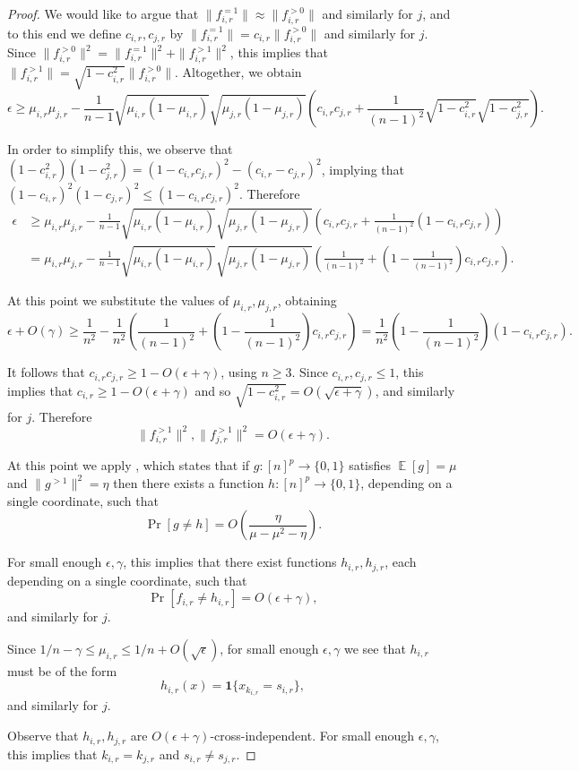 \documentclass{article}
\providecommand{\ind}[1]{\mathbf1\{#1\}}
\DeclareMathOperator*{\Ex}{\mathbb{E}}
\theoremstyle{definition}
\theoremstyle{remark}
\begin{document}
\begin{proof}
We would like to argue that $\|f_{i,r}^{=1}\| \approx \|f_{i,r}^{>0}\|$ and similarly for $j$, and to this end we define $c_{i,r},c_{j,r}$ by $\|f_{i,r}^{=1}\| = c_{i,r} \|f_{i,r}^{>0}\|$ and similarly for $j$. Since $\|f_{i,r}^{>0}\|^2 = \|f_{i,r}^{=1}\|^2 + \|f_{i,r}^{>1}\|^2$, this implies that $\|f_{i,r}^{>1}\| = \sqrt{1-c_{i,r}^2} \|f_{i,r}^{>0}\|$. Altogether, we obtain
\[
 \epsilon \ge \mu_{i,r} \mu_{j,r} - \frac{1}{n-1} \sqrt{\mu_{i,r} (1-\mu_{i,r})} \sqrt{\mu_{j,r} (1-\mu_{j,r})} \left( c_{i,r} c_{j,r} + \frac{1}{(n-1)^2} \sqrt{1 - c_{i,r}^2} \sqrt{1 - c_{j,r}^2} \right).
\]

In order to simplify this, we observe that $(1 - c_{i,r}^2) (1 - c_{j,r}^2) = (1 - c_{i,r} c_{j,r})^2 - (c_{i,r} - c_{j,r})^2$, implying that $(1 - c_{i,r})^2 (1 - c_{j,r})^2 \leq (1 - c_{i,r} c_{j,r})^2$. Therefore
\begin{align*}
 \epsilon &\ge \mu_{i,r} \mu_{j,r} - \frac{1}{n-1} \sqrt{\mu_{i,r} (1-\mu_{i,r})} \sqrt{\mu_{j,r} (1-\mu_{j,r})} \left( c_{i,r} c_{j,r} + \frac{1}{(n - 1)^2} (1 - c_{i,r} c_{j,r}) \right) \\ &=
 \mu_{i,r} \mu_{j,r} - \frac{1}{n-1} \sqrt{\mu_{i,r} (1-\mu_{i,r})} \sqrt{\mu_{j,r} (1-\mu_{j,r})} \left( \frac{1}{(n-1)^2} + \left(1 - \frac{1}{(n-1)^2}\right) c_{i,r} c_{j,r}\right).
\end{align*}

At this point we substitute the values of $\mu_{i,r}, \mu_{j,r}$, obtaining
\[
 \epsilon + O(\gamma) \ge \frac{1}{n^2} - \frac{1}{n^2} \left( \frac{1}{(n-1)^2} + \left(1 - \frac{1}{(n-1)^2}\right) c_{i,r} c_{j,r}\right) =
 \frac{1}{n^2} \left(1 - \frac{1}{(n-1)^2}\right) (1 - c_{i,r} c_{j,r}).
\]

It follows that $c_{i,r} c_{j,r} \ge 1 - O(\epsilon + \gamma)$, using $n \ge 3$. Since $c_{i,r}, c_{j,r} \leq 1$, this implies that $c_{i,r} \ge 1 - O(\epsilon + \gamma)$ and so $\sqrt{1 - c_{i,r}^2} = O(\sqrt{\epsilon + \gamma})$, and similarly for $j$. Therefore
\[
 \|f_{i,r}^{>1}\|^2, \|f_{j,r}^{>1}\|^2 = O(\epsilon + \gamma).
\]

At this point we apply \cite[Lemma 2.4]{ADFS}, which states that if $g\colon [n]^p \to \{0,1\}$ satisfies $\Ex[g] = \mu$ and $\|g^{>1}\|^2 = \eta$ then there exists a function $h\colon [n]^p \to \{0,1\}$, depending on a single coordinate, such that
\[
 \Pr[g \neq h] = O\left(\frac{\eta}{\mu - \mu^2 - \eta}\right).
\]

For small enough $\epsilon,\gamma$, this implies that there exist functions $h_{i,r},h_{j,r}$, each depending on a single coordinate, such that
\[
 \Pr[f_{i,r} \neq h_{i,r}] = O(\epsilon + \gamma),
\]
and similarly for $j$.

Since $1/n - \gamma \leq \mu_{i,r} \leq 1/n + O(\sqrt{\epsilon})$, for small enough $\epsilon,\gamma$ we see that $h_{i,r}$ must be of the form
\[
 h_{i,r}(x) = \ind{x_{k_{i,r}} = s_{i,r}},
\]
and similarly for $j$.

Observe that $h_{i,r},h_{j,r}$ are $O(\epsilon + \gamma)$-cross-independent. For small enough $\epsilon,\gamma$, this implies that $k_{i,r} = k_{j,r}$ and $s_{i,r} \neq s_{j,r}$.
\end{proof}
\end{document}
